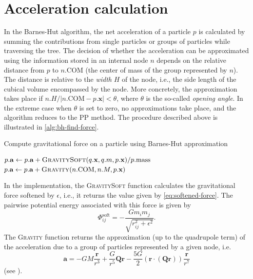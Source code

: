 \section{Acceleration calculation}
In the Barnes-Hut algorithm, the net acceleration of a particle $p$ is calculated by summing the contributions from single particles or groups of particles while traversing the tree.
The decision of whether the acceleration can be approximated using the information stored in an internal node $n$ depends on the relative distance from $p$ to $n.\textrm{COM}$ (the center of mass of the group represented by $n$).
The distance is relative to the \textit{width} $H$ of the node, i.e., the side length of the cubical volume encompassed by the node.
More concretely, the approximation takes place if $n.H / |n.\mathrm{COM} - p.\mathbf{x}| < \theta$, where $\theta$ is the so-called \textit{opening angle}.
In the extreme case when $\theta$ is set to zero, no approximations take place, and the algorithm reduces to the PP method.
The procedure described above is illustrated in \autoref{alg:bh-find-force}.
\begin{algorithm}
    \caption{Compute gravitational force on a particle using Barnes-Hut approximation}
    \label{alg:bh-find-force}
    \begin{algorithmic}[1]
        \State $p.\mathbf{a} \gets p.\mathbf{a} + \Call{GravitySoft}{q.\mathbf{x}, q.m, p.\mathbf{x}} / p.\text{mass}$
        \EndIf
        \State \Return
        \EndIf
        \State $p.\mathbf{a} \gets p.\mathbf{a} + \Call{Gravity}{n.\mathrm{COM}, n.M, p.\mathbf{x}}$
        \State \Return
        \EndIf
        \State {}
        \EndFor
        \EndFunction
    \end{algorithmic}
\end{algorithm}
In the implementation, the \textsc{GravitySoft} function calculates the gravitational force softened by $\epsilon$, i.e., it returns the value given by \autoref{eq:softened-force}.
The pairwise potential energy associated with this force is given by
\begin{equation}\label{eq:pe-soft}
    \Phi_{ij}^\textrm{soft} = - \frac{G m_i m_j}{\sqrt{r_{ij}^2 + \epsilon^2}}.
\end{equation}
The \textsc{Gravity} function returns the approximation (up to the quadrupole term) of the acceleration due to a group of particles represented by a given node, i.e.
\begin{equation*}
    \mathbf{a} = -GM \frac{\mathbf{r}}{r^3} + \frac{G}{r^5}\mathbf{Q}\mathbf{r} - \frac{5G}{2}(\mathbf{r} \cdot (\mathbf{Q} \mathbf{r})) \frac{\mathbf{r}}{r^7}
\end{equation*}
(see \cite{hernquist1987performance}).

